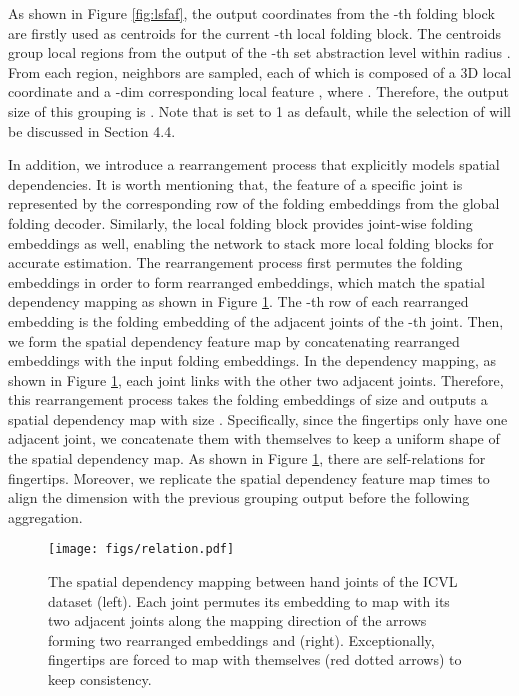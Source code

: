 \documentclass[10pt,twocolumn,letterpaper]{article}
\begin{document}
As shown in Figure \ref{fig:lsfaf}, the output coordinates from the -th folding block are firstly used as centroids for the current -th local folding block. The  centroids group  local regions from the output of the -th set abstraction level within radius . From each region,  neighbors are sampled, each of which is composed of a 3D local coordinate  and a -dim corresponding local feature , where . 
Therefore, the output size of this grouping is . 
Note that  is set to 1 as default, while the selection of  will be discussed in Section 4.4.

In addition, we introduce a rearrangement process that explicitly models spatial dependencies. It is worth mentioning that, the feature of a specific joint is represented by the corresponding row of the folding embeddings from the global folding decoder. Similarly, the local folding block provides joint-wise folding embeddings as well, enabling the network to stack more local folding blocks for accurate estimation. 
The rearrangement process first permutes the folding embeddings in order to form rearranged embeddings, which match the spatial dependency mapping as shown in Figure \ref{fig:relation}. The -th row of each rearranged embedding is the folding embedding of the adjacent joints of the -th joint. Then, we form the spatial dependency feature map by concatenating rearranged embeddings with the input folding embeddings. In the dependency mapping, as shown in Figure \ref{fig:relation}, each joint links with the other two adjacent joints. Therefore, this rearrangement process takes the folding embeddings of size  and outputs a spatial dependency map with size . Specifically, since the fingertips only have one adjacent joint, we concatenate them with themselves to keep a uniform shape of the spatial dependency map. As shown in Figure \ref{fig:relation}, there are self-relations for fingertips. 
Moreover, we replicate the spatial dependency feature map  times to align the dimension with the previous grouping output before the following aggregation. 


\begin{figure}
\centering
\texttt{[image: figs/relation.pdf]}
\caption{The spatial dependency mapping between hand joints of the ICVL dataset (left). Each joint permutes its embedding  to map with its two adjacent joints along the mapping direction of the arrows forming two rearranged embeddings  and  (right). Exceptionally, fingertips
are forced to map with themselves (red dotted arrows) to keep consistency.}
\label{fig:relation}
\end{figure}
\end{document}
